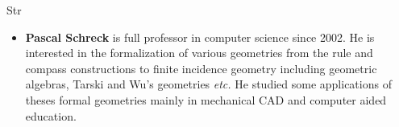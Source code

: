 \begin{sitedescription}{Str}
\begin{itemize}
\item{\bf Pascal Schreck} is full professor in computer science since 2002. He is interested in the formalization of various geometries from the rule and compass constructions to finite incidence geometry including geometric algebras, Tarski and Wu's geometries \emph{etc.} He studied some applications of theses formal geometries mainly in mechanical CAD and computer aided education.
\end{itemize}

\end{sitedescription}

